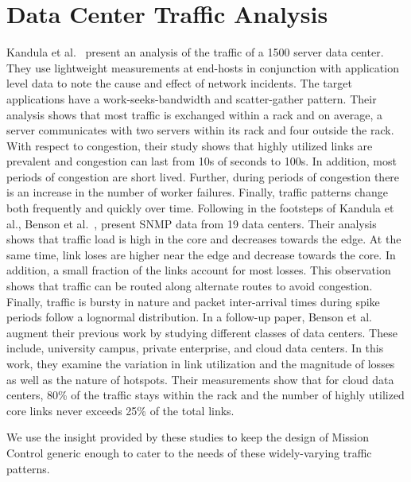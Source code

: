 \documentclass[a4paper,12pt,twoside,openright]{report}
\begin{document}
\section{Data Center Traffic Analysis}
Kandula et al.~\cite{Kandula:2009:NDC} present an analysis of the traffic of a
1500 server data center. They use lightweight measurements at end-hosts in
conjunction with application level data to note the cause and effect of network
incidents. The target applications have a work-seeks-bandwidth and
scatter-gather pattern. Their analysis shows that most traffic is exchanged
within a rack and on average, a server communicates with two servers within its
rack and four outside the rack. With respect to congestion, their study shows
that highly utilized links are prevalent and congestion can last from 10s of
seconds to 100s. In addition, most periods of congestion are short lived.
Further, during periods of congestion there is an increase in the number of
worker failures. Finally, traffic patterns change both frequently and quickly
over time. Following in the footsteps of Kandula et al., Benson et
al.~\cite{Benson:2009:UDC}, present SNMP data from 19 data centers. Their
analysis shows that traffic load is high in the core and decreases towards the
edge. At the same time, link loses are higher near the edge and decrease towards
the core. In addition, a small fraction of the links account for most losses.
This observation shows that traffic can be routed along alternate routes to
avoid congestion. Finally, traffic is bursty in nature and packet inter-arrival
times during spike periods follow a lognormal distribution. In a follow-up
paper, Benson et al.~\cite{Benson:2010:NTC} augment their previous work by
studying different classes of data centers. These include, university campus,
private enterprise, and cloud data centers. In this work, they examine the
variation in link utilization and the magnitude of losses as well as the nature
of hotspots. Their measurements show that for cloud data centers, 80\% of the
traffic stays within the rack and the number of highly utilized core links never
exceeds 25\% of the total links.

We use the insight provided by these studies to keep the design of Mission
Control generic enough to cater to the needs of these widely-varying traffic
patterns.
\end{document}
